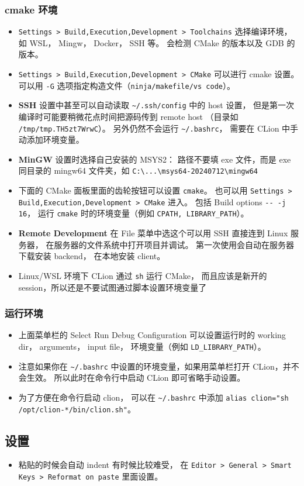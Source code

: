 \subsubsection{cmake 环境}
\begin{itemize}
\item \verb`Settings > Build,Execution,Development > Toolchains` 选择编译环境， 如 WSL， Mingw， Docker， SSH 等。 会检测 CMake 的版本以及 GDB 的版本。
\item \verb`Settings > Build,Execution,Development > CMake` 可以进行 cmake 设置。 可以用 \verb`-G` 选项指定构造文件（\verb`ninja/makefile/vs code`）。
\item \textbf{SSH} 设置中甚至可以自动读取 \verb`~/.ssh/config` 中的 host 设置， 但是第一次编译时可能要稍微花点时间把源码传到 remote host （目录如 \verb`/tmp/tmp.TH5zt7WrwC`）。 另外仍然不会运行 \verb`~/.bashrc`， 需要在 CLion 中手动添加环境变量。
\item \textbf{MinGW} 设置时选择自己安装的 MSYS2： 路径不要填 exe 文件，而是 exe 同目录的 mingw64 文件夹，如 \verb`C:\...\msys64-20240712\mingw64`
\item 下面的 CMake 面板里面的齿轮按钮可以设置 \verb`cmake`。 也可以用 \verb`Settings > Build,Execution,Development > CMake` 进入。 包括 Build options \verb`-- -j 16`， 运行 \verb`cmake` 时的环境变量（例如 \verb`CPATH, LIBRARY_PATH`）。
\item \textbf{Remote Development} 在 File 菜单中选这个可以用 SSH 直接连到 Linux 服务器， 在服务器的文件系统中打开项目并调试。 第一次使用会自动在服务器下载安装 backend， 在本地安装 client。
\item Linux/WSL 环境下 CLion 通过 \verb`sh` 运行 CMake， 而且应该是新开的 session，所以还是不要试图通过脚本设置环境变量了
\end{itemize}

\subsubsection{运行环境}
\begin{itemize}
\item 上面菜单栏的 Select Run Debug Configuration 可以设置运行时的 working dir， arguments， input file， 环境变量（例如 \verb`LD_LIBRARY_PATH`）。
\item 注意如果你在 \verb`~/.bashrc` 中设置的环境变量，如果用菜单栏打开 CLion，并不会生效。 所以此时在命令行中启动 CLion 即可省略手动设置。
\item 为了方便在命令行启动 clion， 可以在 \verb`~/.bashrc` 中添加 \verb`alias clion="sh /opt/clion-*/bin/clion.sh"`。
\end{itemize}

\subsection{设置}
\begin{itemize}
\item 粘贴的时候会自动 indent 有时候比较难受， 在 \verb`Editor > General > Smart Keys > Reformat on paste` 里面设置。
\end{itemize}
